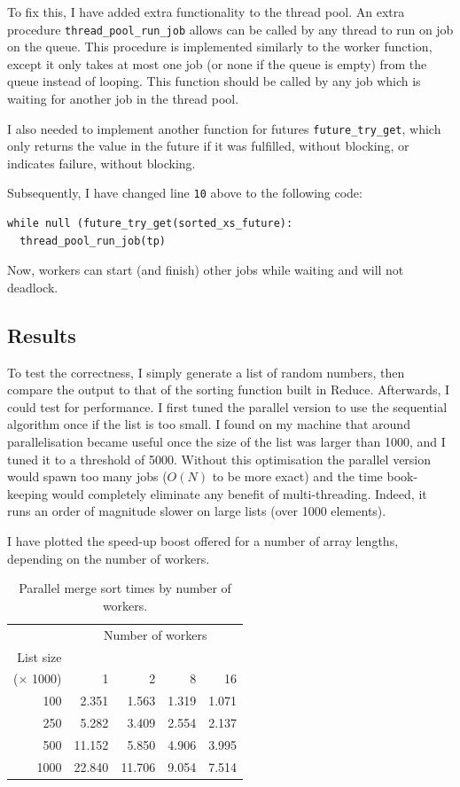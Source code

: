 To fix this, I have added extra functionality to the thread pool. An extra procedure \texttt{thread\_pool\_run\_job}
allows can be called by any thread to run on job on the queue. This procedure is implemented similarly
to the worker function, except it only takes at most one job (or none if the queue is empty) from the
queue instead of looping.
This function should be called by any job which is waiting for another job in the thread pool.

I also needed to implement another function for futures \texttt{future\_try\_get}, which only returns the
value in the future if it was fulfilled, without blocking, or indicates failure, without blocking.

Subsequently, I have changed line \texttt{10} above to the following code:
\begin{verbatim}
while null (future_try_get(sorted_xs_future):
  thread_pool_run_job(tp)
\end{verbatim}
Now, workers can start (and finish) other jobs while waiting and will not deadlock.

\subsection{Results}

To test the correctness, I simply generate a list of random numbers, then compare the output
to that of the sorting function built in Reduce. Afterwards, I could test for performance.
I first tuned the parallel version to use the sequential algorithm once if the list is too
small. I found on my machine that around parallelisation became useful once the size of
the list was larger than 1000, and I tuned it to a threshold of 5000. Without this optimisation
the parallel version would spawn too many jobs (\(O(N)\) to be more exact) and the time book-keeping
would completely eliminate any benefit of multi-threading. Indeed, it runs an order of magnitude
slower on large lists (over 1000 elements).

I have plotted the speed-up boost offered for a number of array lengths, depending on the number
of workers.


\begin{table}
\centering
\begin{tabular}{rrrrr}
& \multicolumn{4}{c}{Number of workers} \\
List size & & & \\
($\times$ 1000) & 1 & 2 & 8 & 16\\
\hline
100  & 2.351 & 1.563 & 1.319 & 1.071 \\
250  & 5.282 & 3.409 & 2.554 & 2.137 \\
500  & 11.152 &  5.850 & 4.906 & 3.995 \\
1000 & 22.840 & 11.706 & 9.054 & 7.514 \\
\end{tabular}
\caption{Parallel merge sort times by number of workers.}
\label{table:parmergesort}
\end{table}

